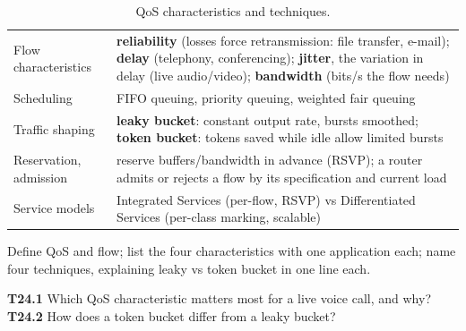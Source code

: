 \begin{table}[H]\centering\footnotesize\zebra
\begin{tabularx}{\linewidth}{L{30mm}Y}\toprule
{} & \\\midrule
Flow characteristics & \textbf{reliability} (losses force retransmission: file transfer, e-mail); \textbf{delay} (telephony, conferencing); \textbf{jitter}, the variation in delay (live audio/video); \textbf{bandwidth} (bits/s the flow needs)\\
Scheduling & FIFO queuing, priority queuing, weighted fair queuing\\
Traffic shaping & \textbf{leaky bucket}: constant output rate, bursts smoothed; \textbf{token bucket}: tokens saved while idle allow limited bursts\\
Reservation, admission & reserve buffers/bandwidth in advance (RSVP); a router admits or rejects a flow by its specification and current load\\
Service models & Integrated Services (per-flow, RSVP) vs Differentiated Services (per-class marking, scalable)\\\bottomrule
\end{tabularx}
\caption{QoS characteristics and techniques.}
\end{table}

\begin{answerplan}
Define QoS and flow; list the four characteristics with one application each; name four techniques, explaining leaky vs token bucket in one line each.
\par{} \textbf{T24.1} Which QoS characteristic matters most for a live voice call, and why?\quad \textbf{T24.2} How does a token bucket differ from a leaky bucket?
\end{answerplan}

